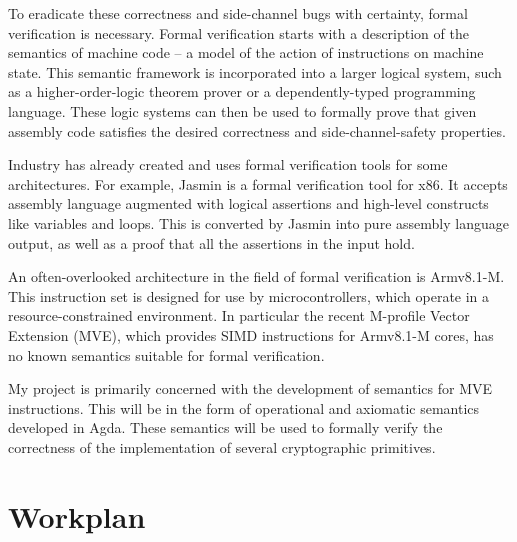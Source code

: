 \documentclass[11pt]{article}
\begin{document}
To eradicate these correctness and side-channel bugs with certainty, formal
verification is necessary. Formal verification starts with a description of
the semantics of machine code -- a model of the action of instructions on
machine state. This semantic framework is incorporated into a larger logical
system, such as a higher-order-logic theorem prover or a dependently-typed
programming language. These logic systems can then be used to formally prove
that given assembly code satisfies the desired correctness and
side-channel-safety properties.

Industry has already created and uses formal verification tools for some
architectures. For example, Jasmin is a formal verification tool for x86. It
accepts assembly language augmented with logical assertions and high-level
constructs like variables and loops. This is converted by Jasmin into pure
assembly language output, as well as a proof that all the assertions in the
input hold.

An often-overlooked architecture in the field of formal verification
is Armv8.1-M. This instruction set is designed for use by microcontrollers,
which operate in a resource-constrained environment. In particular the recent
M-profile Vector Extension (MVE), which provides SIMD instructions for
Armv8.1-M cores, has no known semantics suitable for formal verification.

My project is primarily concerned with the development of semantics for MVE
instructions. This will be in the form of operational and axiomatic semantics
developed in Agda. These semantics will be used to formally verify the
correctness of the implementation of several cryptographic primitives.

\section{Workplan}
\label{sec:orgf4c603b}
\end{document}

